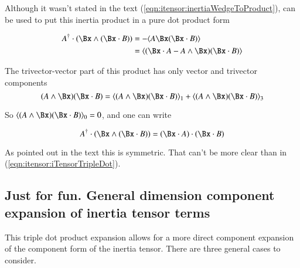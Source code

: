 Although it wasn't stated in the text (\ref{eqn:itensor:inertiaWedgeToProduct}), can
be used to put this inertia product in a pure dot product form

\begin{align*}
A^\dagger \cdot (\Bx \wedge (\Bx \cdot B) )
&= -\langle {A \Bx (\Bx \cdot B)} \rangle \\
&= \langle (\Bx \cdot A - A \wedge \Bx)(\Bx \cdot B) \rangle \\
\end{align*}

The trivector-vector part of this product has only vector and trivector components
\[
(A \wedge \Bx)(\Bx \cdot B) = \langle{ (A \wedge \Bx)(\Bx \cdot B)}\rangle_1 + \langle{(A \wedge \Bx)(\Bx \cdot B)}\rangle_3
\]

So $\langle{(A \wedge \Bx)(\Bx \cdot B)}\rangle_0 = 0$, and one can write

\begin{equation}
A^\dagger \cdot (\Bx \wedge (\Bx \cdot B) ) = (\Bx \cdot A) \cdot (\Bx \cdot B)
\end{equation}\label{eqn:itensor:iTensorTripleDot}

As pointed out in the text this is symmetric.  That can't be more clear than in (\ref{eqn:itensor:iTensorTripleDot}).

\subsection{Just for fun.  General dimension component expansion of inertia tensor terms }

This triple dot product expansion allows for a more direct component expansion of the component form of the inertia tensor.
There are three general cases to consider.

